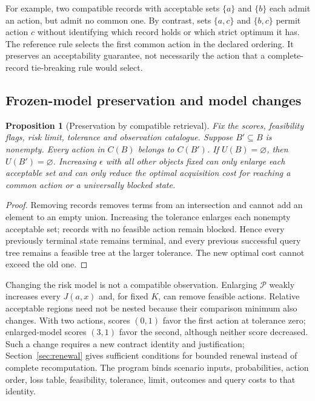 \documentclass[11pt,a4paper]{article}
\newtheorem{proposition}[theorem]{Proposition}
\theoremstyle{definition}\newtheorem{definition}[theorem]{Definition}
\begin{document}
For example, two compatible records with acceptable sets $\{a\}$ and $\{b\}$ each admit an action, but admit no common one. By contrast, sets $\{a,c\}$ and $\{b,c\}$ permit action $c$ without identifying which record holds or which strict optimum it has. The reference rule selects the first common action in the declared ordering. It preserves an acceptability guarantee, not necessarily the action that a complete-record tie-breaking rule would select.

\subsection{Frozen-model preservation and model changes}
\begin{proposition}[Preservation by compatible retrieval]\label{prop:regionpreserve}
Fix the scores, feasibility flags, risk limit, tolerance and observation catalogue. Suppose $B'\subseteq B$ is nonempty. Every action in $C(B)$ belongs to $C(B')$. If $U(B)=\varnothing$, then $U(B')=\varnothing$. Increasing $\epsilon$ with all other objects fixed can only enlarge each acceptable set and can only reduce the optimal acquisition cost for reaching a common action or a universally blocked state.
\end{proposition}
\begin{proof}
Removing records removes terms from an intersection and cannot add an element to an empty union. Increasing the tolerance enlarges each nonempty acceptable set; records with no feasible action remain blocked. Hence every previously terminal state remains terminal, and every previous successful query tree remains a feasible tree at the larger tolerance. The new optimal cost cannot exceed the old one.
\end{proof}

Changing the risk model is not a compatible observation. Enlarging $\mathcal P$ weakly increases every $J(a,x)$ and, for fixed $K$, can remove feasible actions. Relative acceptable regions need not be nested because their comparison minimum also changes. With two actions, scores $(0,1)$ favor the first action at tolerance zero; enlarged-model scores $(3,1)$ favor the second, although neither score decreased. Such a change requires a new contract identity and justification; Section~\ref{sec:renewal} gives sufficient conditions for bounded renewal instead of complete recomputation. The program binds scenario inputs, probabilities, action order, loss table, feasibility, tolerance, limit, outcomes and query costs to that identity.
\end{document}

